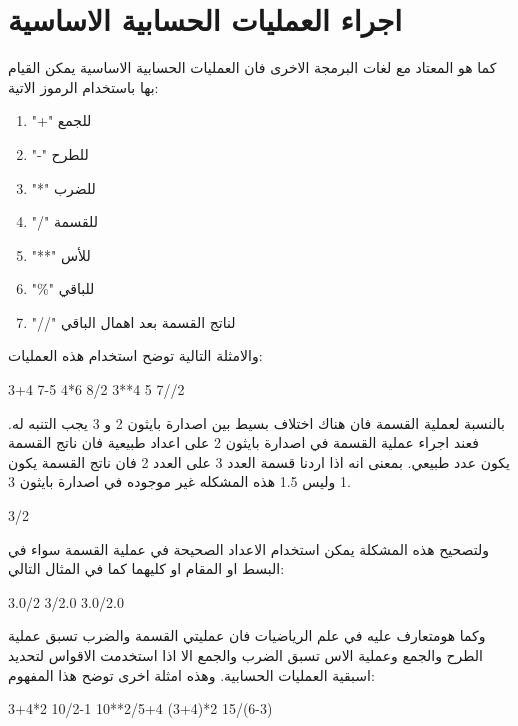\section{اجراء العمليات الحسابية الاساسية}
كما هو المعتاد مع لغات البرمجة الاخرى فان العمليات الحسابية الاساسية يمكن القيام بها باستخدام الرموز الاتية:
\begin{enumerate}
\item
"+" للجمع
\item
"-" للطرح
\item
"*" للضرب
\item
"/" للقسمة
\item
"**" للأس
\item
"\textenglish{\%}"
للباقي
\item
"\textenglish{//}"
لناتج القسمة بعد اهمال الباقي
\end{enumerate}
والامثلة التالية توضح استخدام هذه العمليات:
\begin{english}
\begin{mybox}
\begin{pyconsole}
3+4
7-5
4*6
8/2
3**4
5%
7//2
\end{pyconsole}
\end{mybox}
\end{english}
بالنسبة لعملية القسمة فان هناك اختلاف بسيط بين اصدارة بايثون 2 و 3 يجب التنبه له. فعند اجراء عملية القسمة في اصدارة بايثون 2 على اعداد طبيعية فان ناتج القسمة يكون عدد طبيعي. بمعنى انه اذا اردنا قسمة العدد 3 على العدد 2 فان ناتج القسمة يكون 1 وليس 1.5
هذه المشكله غير موجوده في اصدارة بايثون 3. 
\begin{english}
\begin{mybox}
\begin{pyconsole}
3/2
\end{pyconsole}
\end{mybox}
\end{english}
ولتصحيح هذه المشكلة يمكن استخدام الاعداد الصحيحة في عملية القسمة سواء في البسط او المقام او كليهما كما في المثال التالي:
\begin{english}
\begin{mybox}
\begin{pyconsole}
3.0/2
3/2.0
3.0/2.0
\end{pyconsole}
\end{mybox}
\end{english}

وكما هومتعارف عليه في علم الرياضيات فان عمليتي القسمة والضرب تسبق عملية الطرح والجمع وعملية الاس تسبق الضرب والجمع الا اذا استخدمت الاقواس لتحديد اسبقية العمليات الحسابية. وهذه امثلة اخرى توضح هذا المفهوم:
\begin{english}
\begin{mybox}
\begin{pyconsole}
3+4*2
10/2-1
10**2/5+4
(3+4)*2
15/(6-3)
\end{pyconsole}
\end{mybox}
\end{english}

